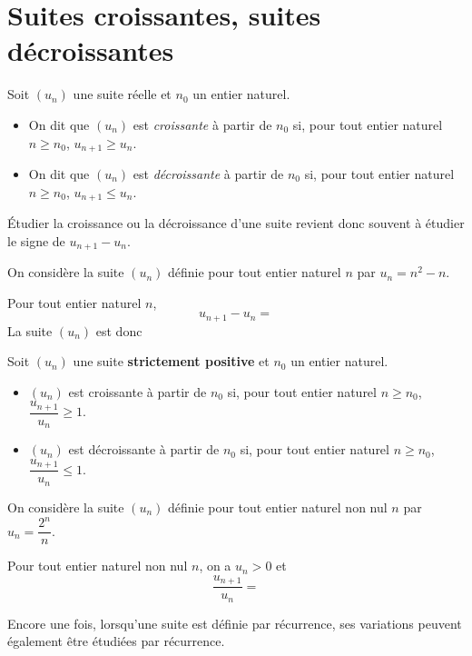 \documentclass[11pt,fleqn]{book} %
\begin{document}
\section{Suites croissantes, suites décroissantes}

\begin{definition}Soit $(u_n)$ une suite réelle et $n_0$ un entier naturel.

\begin{itemize}
\item On dit que $(u_n)$ est \textit{croissante} à partir de $n_0$ si, pour tout entier naturel $n\geqslant n_0$, $u_{n+1} \geqslant u_n$.
\item On dit que $(u_n)$ est \textit{décroissante} à partir de $n_0$ si, pour tout entier naturel $n\geqslant n_0$, $u_{n+1} \leqslant u_n$.
\end{itemize}\end{definition}

Étudier la croissance ou la décroissance d'une suite revient donc souvent à étudier le signe de $u_{n+1}-u_n$.

\begin{example}On considère la suite $(u_n)$ définie pour tout entier naturel $n$ par $u_n=n^2-n$. 

Pour tout entier naturel $n$,
\[u_{n+1}-u_n = \]
La suite $(u_n)$ est donc \end{example}
\newpage
\begin{proposition}Soit $(u_n)$ une suite \textbf{strictement positive} et $n_0$ un entier naturel. 
\begin{itemize}
\item $(u_n)$ est croissante à partir de $n_0$ si, pour tout entier naturel $n\geqslant n_0$, $\dfrac{u_{n+1}}{u_n} \geqslant 1$.
\vskip5pt
\item $(u_n)$ est décroissante à partir de $n_0$ si, pour tout entier naturel $n\geqslant n_0$, $\dfrac{u_{n+1}}{u_n} \leqslant 1$.
\end{itemize}
\end{proposition}

\begin{example}On considère la suite $(u_n)$ définie pour tout entier naturel non nul $n$ par $u_n=\dfrac{2^n}{n}$. 

Pour tout entier naturel non nul $n$, on a $u_n>0$ et 
\[\dfrac{u_{n+1}}{u_n}=\]
\vskip50pt
\end{example}

Encore une fois, lorsqu'une suite est définie par récurrence, ses variations peuvent également être étudiées par récurrence.
\end{document}
